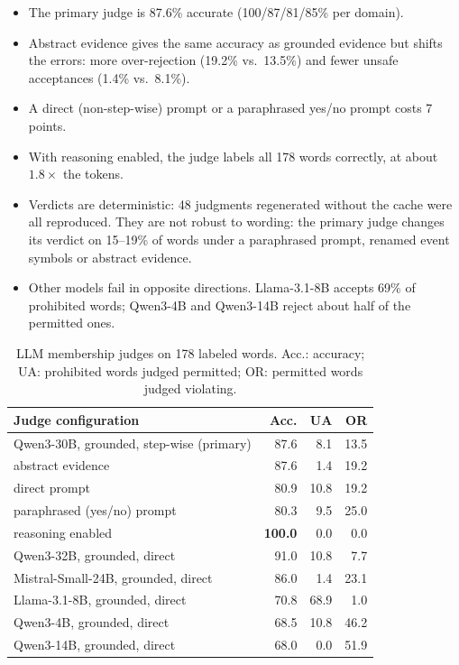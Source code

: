\begin{itemize}
  \item The primary judge is 87.6\% accurate (100/87/81/85\% per domain).
  \item Abstract evidence gives the same accuracy as grounded evidence but shifts the errors: more over-rejection
  (19.2\% vs.\ 13.5\%) and fewer unsafe acceptances (1.4\% vs.\ 8.1\%).
  \item A direct (non-step-wise) prompt or a paraphrased yes/no prompt costs 7 points.
  \item With reasoning enabled, the judge labels all 178 words correctly, at about $1.8\times$ the tokens.
  \item Verdicts are deterministic: 48 judgments regenerated without the cache were all reproduced. They are not robust
  to wording: the primary judge changes its verdict on 15--19\% of words under a paraphrased prompt, renamed event
  symbols or abstract evidence.
  \item Other models fail in opposite directions. Llama-3.1-8B accepts 69\% of prohibited words; Qwen3-4B and Qwen3-14B
  reject about half of the permitted ones.
\end{itemize}

\begin{table}[t]
  \caption{LLM membership judges on 178 labeled words. Acc.: accuracy; UA: prohibited words judged permitted; OR:
  permitted words judged violating.}
  \label{tab:judges}
  \small
  \setlength{\tabcolsep}{4pt}
  \begin{tabular}{@{}lrrr@{}}
    \toprule
    Judge configuration & Acc. & UA & OR \\
    \midrule
    Qwen3-30B, grounded, step-wise (primary) & 87.6 & 8.1 & 13.5 \\
    \quad abstract evidence                  & 87.6 & 1.4 & 19.2 \\
    \quad direct prompt                      & 80.9 & 10.8 & 19.2 \\
    \quad paraphrased (yes/no) prompt        & 80.3 & 9.5 & 25.0 \\
    \quad reasoning enabled                  & \textbf{100.0} & 0.0 & 0.0 \\
    Qwen3-32B, grounded, direct              & 91.0 & 10.8 & 7.7 \\
    Mistral-Small-24B, grounded, direct      & 86.0 & 1.4 & 23.1 \\
    Llama-3.1-8B, grounded, direct           & 70.8 & 68.9 & 1.0 \\
    Qwen3-4B, grounded, direct               & 68.5 & 10.8 & 46.2 \\
    Qwen3-14B, grounded, direct              & 68.0 & 0.0 & 51.9 \\
    \bottomrule
  \end{tabular}
\end{table}


